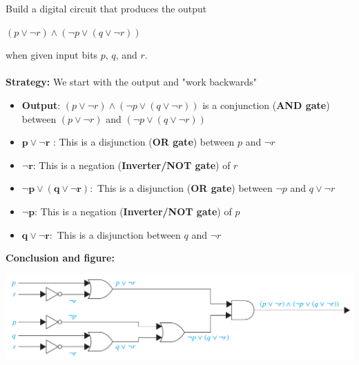 \begin{tcolorbox}[title=Example 2: Combinatorial circuit when want a certain output]
Build a digital circuit that produces the output 
\begin{center}
$\left(p \lor \neg r \right) \land \left(\neg p \lor (q \lor \neg r) \right)$    
\end{center}
when given input bits $p$, $q$, and $r$. \\ \\
\textbf{Strategy:}
We start with the output and "work backwards"
\begin{itemize}
    \item \textbf{Output}: $\left(p \lor \neg r \right) \land \left(\neg p \lor (q \lor \neg r) \right)$ is a conjunction (\textbf{AND gate}) between $\left(p \lor \neg r \right)$ and $\left(\neg p \lor (q \lor \neg r) \right)$
    \item $\mathbf{p \lor \neg r }$ : This is a disjunction (\textbf{OR gate}) between $p$ and $\neg r$
    \item $\mathbf{\neg r}$: This is a negation (\textbf{Inverter/NOT gate}) of $r$
    \item $\mathbf{\neg p \lor (q \lor \neg r) }:$ This is a disjunction (\textbf{OR gate}) between $\neg p$ and $q \lor \neg r$
    \item $\mathbf{\neg p}$: This is a negation (\textbf{Inverter/NOT gate}) of $p$
    \item $\mathbf{q \lor \neg r}:$ This is a disjunction between $q$ and $\neg r$
\end{itemize}
\textbf{Conclusion and figure:}
\begin{center}
    \includegraphics[width=0.9\linewidth]{chp1_2_applogic/comb2.png}
\end{center}
\end{tcolorbox}











